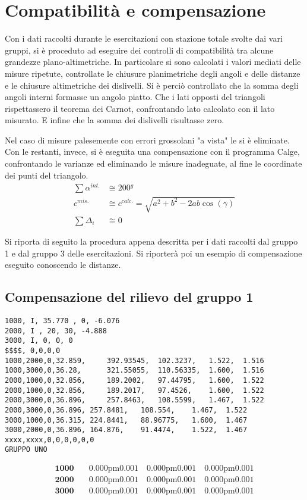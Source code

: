 \chapter{Compatibilità e compensazione}
Con i dati raccolti durante le esercitazioni con stazione totale svolte dai vari gruppi, si è proceduto ad eseguire dei controlli di compatibilità tra alcune grandezze plano-altimetriche.
In particolare si sono calcolati i valori mediati delle misure ripetute, controllate le chiusure planimetriche degli angoli e delle distanze e le chiusure altimetriche dei dislivelli.
Si è perciò controllato che la somma degli angoli interni formasse un angolo piatto. 
Che i lati opposti del triangoli rispettassero il teorema dei Carnot, confrontando lato calcolato con il lato misurato. 
E infine che la somma dei dislivelli risultasse zero.

Nel caso di misure palesemente con errori grossolani "a vista" le si è eliminate.
Con le restanti, invece, si è eseguita una compensazione con il programma Calge, confrontando le varianze ed eliminando le misure inadeguate, al fine le coordinate dei punti del triangolo. 
\begin{align*}
	\sum \alpha^{int.} &\cong \si{200}{^g}\\
	c^{mis.} &\cong c^{calc.} = \sqrt{a^2 + b^2 - 2ab\cos(\gamma)} \\
	\sum \Delta_i &\cong 0
\end{align*}

Si riporta di seguito la procedura appena descritta per i dati raccolti dal gruppo 1 e dal gruppo 3 delle esercitazioni. Si riporterà poi un esempio di compensazione eseguito conoscendo le distanze.
\section{Compensazione del rilievo del gruppo 1}

\begin{footnotesize}\centering
\begin{lstlisting}
1000, I, 35.770 , 0, -6.076
2000, I , 20, 30, -4.888
3000, I, 0, 0, 0
$$$$, 0,0,0,0
1000,2000,0,32.859,     392.93545,	102.3237,	1.522,	1.516
1000,3000,0,36.28,      321.55055,	110.56335,	1.600,	1.516
2000,1000,0,32.856,     189.2002,	97.44795,	1.600,	1.522
2000,1000,0,32.856,     189.2017,	97.4526,	1.600,	1.522
2000,3000,0,36.896,     257.8463,	108.5599,	1.467,	1.522
2000,3000,0,36.896,	257.8481,	108.554,	1.467,	1.522
3000,1000,0,36.315,	224.8441,	88.96775,	1.600,	1.467
3000,2000,0,36.896,	164.876,	91.4474,	1.522,	1.467
xxxx,xxxx,0,0,0,0,0,0
GRUPPO UNO
\end{lstlisting}
\end{footnotesize}
\begin{align*}
	\mathbf{1000}&\quad \si{0.000 \pm 0.001}{} \quad \si{0.000 \pm 0.001}{} \quad \si{0.000 \pm 0.001}{}\\
	\mathbf{2000}&\quad \si{0.000 \pm 0.001}{} \quad \si{0.000 \pm 0.001}{} \quad \si{0.000 \pm 0.001}{}\\
	\mathbf{3000}&\quad \si{0.000 \pm 0.001}{} \quad \si{0.000 \pm 0.001}{} \quad \si{0.000 \pm 0.001}{}
\end{align*}


